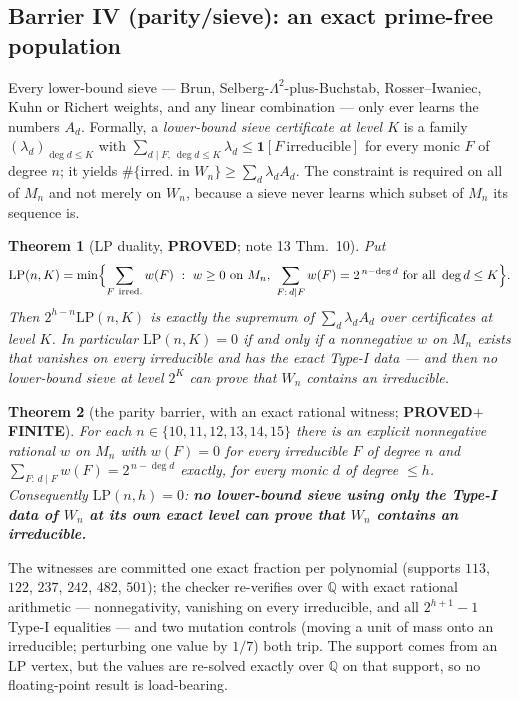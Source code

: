 \documentclass[10pt]{article}
\theoremstyle{plain}
\newtheorem{theorem}{Theorem}[section]
\theoremstyle{definition}
\newcommand{\Q}{\mathbb Q}
\newcommand{\proved}{\textcolor{proved}{\textsf{\textbf{\footnotesize PROVED}}}}
\newcommand{\finite}{\textcolor{finite}{\textsf{\textbf{\footnotesize FINITE}}}}
\begin{document}
\subsection{Barrier IV (parity/sieve): an exact prime-free population}

Every lower-bound sieve --- Brun, Selberg-$\Lambda^2$-plus-Buchstab,
Rosser--Iwaniec, Kuhn or Richert weights, and any linear combination --- only
ever learns the numbers $A_d$. Formally, a \emph{lower-bound sieve certificate
at level $K$} is a family $(\lambda_d)_{\deg d\le K}$ with
$\sum_{d\mid F,\ \deg d\le K}\lambda_d\le\mathbf1[F\ \text{irreducible}]$ for
every monic $F$ of degree $n$; it yields
$\#\{\text{irred.\ in }W_n\}\ge\sum_d\lambda_dA_d$. The constraint is required
on all of $M_n$ and not merely on $W_n$, because a sieve never learns which
subset of $M_n$ its sequence is.

\begin{theorem}[LP duality, \proved; note 13 Thm.~10]\label{thm:lp}
Put
\[
 \mathrm{LP}(n,K)=\min\Bigl\{\sum_{F\ \mathrm{irred.}}w(F)\ :\ w\ge0\ \text{on }M_n,\
 \sum_{F:\,d\mid F}w(F)=2^{\,n-\deg d}\ \text{for all }\deg d\le K\Bigr\}.
\]
Then $2^{h-n}\mathrm{LP}(n,K)$ is exactly the supremum of
$\sum_d\lambda_dA_d$ over certificates at level $K$. In particular
$\mathrm{LP}(n,K)=0$ if and only if a nonnegative $w$ on $M_n$ exists that
vanishes on every irreducible and has the exact Type-I data --- and then no
lower-bound sieve at level $2^K$ can prove that $W_n$ contains an irreducible.
\end{theorem}

\begin{theorem}[the parity barrier, with an exact rational witness;
\proved{}$+$\finite]\label{thm:parity}
For each $n\in\{10,11,12,13,14,15\}$ there is an explicit nonnegative rational
$w$ on $M_n$ with $w(F)=0$ for every irreducible $F$ of degree $n$ and
$\sum_{F:\,d\mid F}w(F)=2^{\,n-\deg d}$
exactly, for every monic $d$ of degree $\le h$. Consequently $\mathrm{LP}(n,h)=0$: \textbf{no lower-bound sieve
using only the Type-I data of $W_n$ at its own exact level can prove that $W_n$
contains an irreducible.}
\end{theorem}

The witnesses are committed one exact fraction per polynomial (supports $113$,
$122$, $237$, $242$, $482$, $501$); the checker re-verifies over $\Q$ with
exact rational arithmetic --- nonnegativity, vanishing on every irreducible, and
all $2^{h+1}-1$ Type-I equalities --- and two mutation controls (moving a unit of
mass onto an irreducible; perturbing one value by $1/7$) both trip. The support
comes from an LP vertex, but the values are re-solved exactly over $\Q$ on that
support, so no floating-point result is load-bearing.
\end{document}
